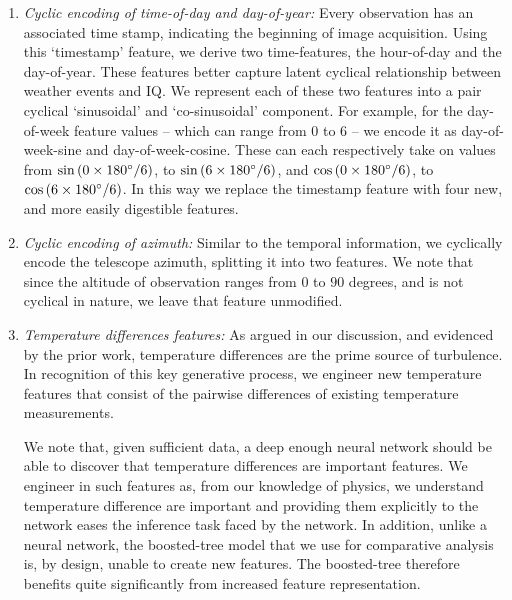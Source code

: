 \begin{enumerate}
\item \textit{Cyclic encoding of time-of-day and day-of-year:}
Every observation has an associated time stamp, indicating the beginning of image acquisition. Using this `timestamp' feature, we derive two time-features, the hour-of-day and the day-of-year.  These features better capture latent cyclical relationship between weather events and IQ. We represent each of these two features into a pair cyclical `sinusoidal' and `co-sinusoidal' component. For example, for the day-of-week feature values -- which can range from 0 to 6 -- we encode it as day-of-week-sine and day-of-week-cosine.  These can each respectively take on values from $\sin{\left(0\times180\degree/6\right)}$, to $\sin{\left(6\times180\degree/6\right)}$, and $\cos{\left(0\times180\degree/6\right)}$, to $\cos{\left(6\times180\degree/6\right)}$. In this way we replace the timestamp feature with four new, and more easily digestible features.

\item \textit{Cyclic encoding of azimuth:} Similar to the temporal information, we cyclically encode the telescope azimuth, splitting it into two features. We note that since the altitude of observation ranges from $0$ to $90$ degrees, and is not cyclical in nature, we leave that feature unmodified.
    
\item \textit{Temperature differences features:} 
As argued in our discussion, and evidenced by the prior work, temperature differences are the prime source of turbulence. In recognition of this key generative process, we engineer new temperature features that consist of the pairwise differences of existing temperature measurements.

We note that, given sufficient data, a deep enough neural network should be able to discover that temperature differences are important features.  We engineer in such features as, from our knowledge of physics, we understand temperature difference are important and providing them explicitly to the network eases the inference task faced by the network. In addition, unlike a neural network, the boosted-tree model that we use for comparative analysis is, by design, unable to create new features. The boosted-tree therefore benefits quite significantly from increased feature representation.


\end{enumerate}
